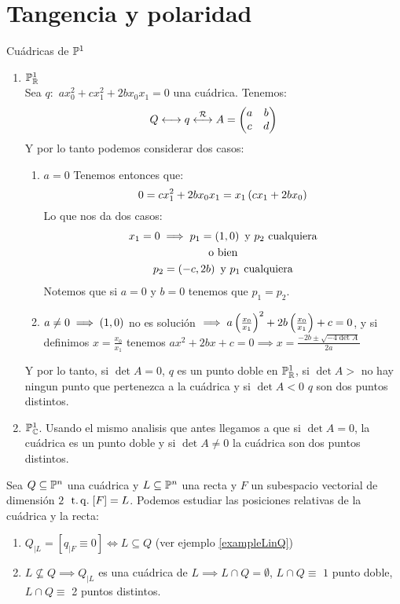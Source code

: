 \section{Tangencia y polaridad}

\begin{example} Cuádricas de $\mathbb{P}^1$
   \begin{enumerate}
      \item $\mathbb{P}^1_{\mathbb{R}}$\\
      Sea $q:$ $ax^{2}_{0} + cx^{2}_{1}+2bx_0x_1=0$ una cuádrica. Tenemos:
      \[
	Q \longleftrightarrow q \stackrel{\mathcal{R}}{\longleftrightarrow}A=
      \begin{pmatrix}
	a & b\\
	c & d\\
      \end{pmatrix}
      \]
      Y por lo tanto podemos considerar dos casos:
      \begin{enumerate}
	\item $a=0$ Tenemos entonces que:
	\[
	  0=cx^{2}_{1}+2bx_0x_1 = x_1 \left( cx_1 +2bx_0 \right) 
	\]
	Lo que nos da dos casos:
	\begin{gather*}
	  x_1=0 \implies p_1=\left( 1,0\right) \text{ y $p_2$ cualquiera}\\
	  \text{o bien}\\
	  p_2=\left( -c,2b\right) \text{ y $p_1$ cualquiera}\\
	\end{gather*}
	Notemos que si $a=0$ y $b=0$ tenemos que $p_1=p_2$.
	
	\item $a\neq 0 \implies \left( 1,0\right)$ no es solución 
	$\implies a\left(\frac{x_0}{x_1}\right) ^2 +2b\left(\frac{x_0}{x_1}\right) +c=0$,
	y si definimos $x=\frac{x_0}{x_1}$ tenemos $ax^2 +2bx+c=0 \implies
	x=\frac{-2b \pm \sqrt{-4\det A}}{2a}$\\
      \end{enumerate}
      Y por lo tanto, si $\det A = 0$, $q$ es un punto doble en $\mathbb{P}^1_{\mathbb{R}}$,
      si $\det A>$ no hay ningun punto que pertenezca a la cuádrica y si 
      $\det A <0$ $q$ son dos puntos distintos.
      
      \item $\mathbb{P}^1_\mathbb{C}$. Usando el mismo analisis que antes llegamos a que si
      $\det A=0$, la cuádrica es un punto doble y si $\det A \neq 0$ la cuádrica 
      son dos puntos distintos.
   \end{enumerate}
\end{example}
\begin{obs}
  Sea $Q\subseteq \mathbb{P}^n$ una cuádrica y $L\subseteq \mathbb{P}^n$ una recta y $F$ un subespacio 
  vectorial de dimensión $2$ $\operatorname{\;t.q.\;} [F]=L$. Podemos estudiar las posiciones relativas
  de la cuádrica y la recta:
  \begin{enumerate}
   \item $Q_{|L}=\left[ q_{|F} \equiv 0\right] \iff L\subseteq Q$ (ver ejemplo \ref{exampleLinQ})
   \item $L\not\subseteq Q \implies Q_{|L}$ es una cuádrica de $L \implies L\cap 
   Q = \emptyset$, $L\cap Q\equiv$ $1$ punto doble, $L\cap Q\equiv$ 2 puntos distintos.
  \end{enumerate}
\end{obs}
